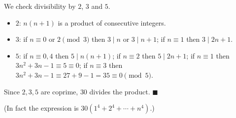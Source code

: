 We check divisibility by $2$, $3$ and $5$.
\begin{itemize}
\item $2$: $n(n+1)$ is a product of consecutive integers.
\item $3$: if $n\equiv0$ or $2\pmod3$ then $3\mid n$ or $3\mid n+1$; if $n\equiv1$ then $3\mid2n+1$.
\item $5$: if $n\equiv0,4$ then $5\mid n(n+1)$; if $n\equiv2$ then $5\mid2n+1$; if $n\equiv1$ then $3n^2+3n-1\equiv5\equiv0$; if $n\equiv3$ then $3n^2+3n-1\equiv27+9-1=35\equiv0\pmod5$.
\end{itemize}
Since $2,3,5$ are coprime, $30$ divides the product. $\blacksquare$

(In fact the expression is $30(1^4+2^4+\cdots+n^4)$.)
